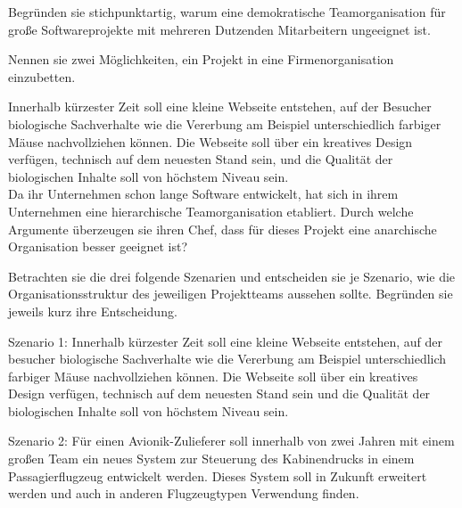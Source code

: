 \documentclass[12pt]{exam}
\begin{document}
\begin{questions}

\question[2] Begründen sie stichpunktartig, warum eine demokratische Teamorganisation für große Softwareprojekte mit mehreren Dutzenden Mitarbeitern ungeeignet ist.
\addpoints

\question[2] Nennen sie zwei Möglichkeiten, ein Projekt in eine Firmenorganisation einzubetten.
\addpoints

\question[4] Innerhalb kürzester Zeit soll eine kleine Webseite entstehen, auf der Besucher biologische Sachverhalte wie die Vererbung am Beispiel unterschiedlich farbiger Mäuse nachvollziehen können. Die Webseite soll über ein kreatives Design verfügen, technisch auf dem neuesten Stand sein, und die Qualität der biologischen Inhalte soll von höchstem Niveau sein. \\Da ihr Unternehmen schon lange Software entwickelt, hat sich in ihrem Unternehmen eine hierarchische Teamorganisation etabliert. Durch welche Argumente überzeugen sie ihren Chef, dass für dieses Projekt eine anarchische Organisation besser geeignet ist?
\addpoints

\question[9] Betrachten sie die drei folgende Szenarien und entscheiden sie je Szenario, wie die Organisationsstruktur des jeweiligen Projektteams aussehen sollte. Begründen sie jeweils kurz ihre Entscheidung.
\addpoints

Szenario 1: Innerhalb kürzester Zeit soll eine kleine Webseite entstehen, auf der besucher biologische Sachverhalte wie die Vererbung am Beispiel unterschiedlich farbiger Mäuse nachvollziehen können. Die Webseite soll über ein kreatives Design verfügen, technisch auf dem neuesten Stand sein und die Qualität der biologischen Inhalte soll von höchstem Niveau sein.

Szenario 2: Für einen Avionik-Zulieferer soll innerhalb von zwei Jahren mit einem großen Team ein neues System zur Steuerung des Kabinendrucks in einem Passagierflugzeug entwickelt werden. Dieses System soll in Zukunft erweitert werden und auch in anderen Flugzeugtypen Verwendung finden.


\end{questions}
\end{document}
